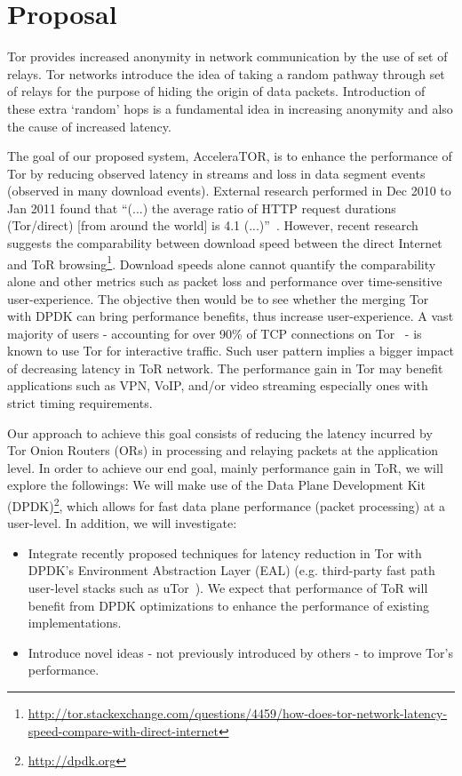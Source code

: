 \section{Proposal}
\label{sec:proposal}

Tor provides increased anonymity in network communication by the use of set of relays. Tor networks introduce the idea of taking a random pathway through set of relays for the purpose of hiding the origin of data packets. Introduction of these extra `random' hops is a fundamental idea in increasing anonymity and also the cause of increased latency.
 
The goal of our proposed system, AcceleraTOR, is to enhance the performance of Tor by reducing observed latency in streams and loss in data segment events (observed in many download events). External research performed in Dec 2010 to Jan 2011 found that ``(...) the average ratio of HTTP request durations (Tor/direct) [from around the world] is 4.1 (...)''~\cite{fi4020488}. However, recent research suggests the comparability between download speed between the direct Internet and ToR browsing\footnote{\label{note1}\url{http://tor.stackexchange.com/questions/4459/how-does-tor-network-latency-speed-compare-with-direct-internet}}. Download speeds alone cannot quantify the comparability alone and other metrics such as packet loss and performance over time-sensitive user-experience. The objective then would be to see whether the merging Tor with DPDK can bring performance benefits, thus increase user-experience. A vast majority of users - accounting for over 90\% of TCP connections on Tor~\cite{Mccoy:2008:SLD:1428259.1428264} - is known to use Tor for interactive traffic. Such user pattern implies a bigger impact of decreasing latency in ToR network. The performance gain in Tor may benefit applications such as VPN, VoIP, and\slash or video streaming especially ones with strict timing requirements. 

Our approach to achieve this goal consists of reducing the latency incurred by Tor Onion Routers (ORs) in processing and relaying packets at the application level. In order to achieve our end goal, mainly performance gain in ToR, we will explore the followings:
We will make use of the Data Plane Development Kit (DPDK)\footnote{\url{http://dpdk.org}}, which allows for fast data plane performance (packet processing) at a user-level. In addition, we will investigate:

\begin{itemize}
	\item Integrate recently proposed techniques for latency reduction in Tor with DPDK’s Environment Abstraction Layer (EAL) (e.g. third-party fast path user-level stacks such as uTor~\cite{179191}). We expect that performance of ToR will benefit from DPDK optimizations to enhance the performance of existing implementations.
	\item Introduce novel ideas - not previously introduced by others - to improve Tor's performance.
\end{itemize}
